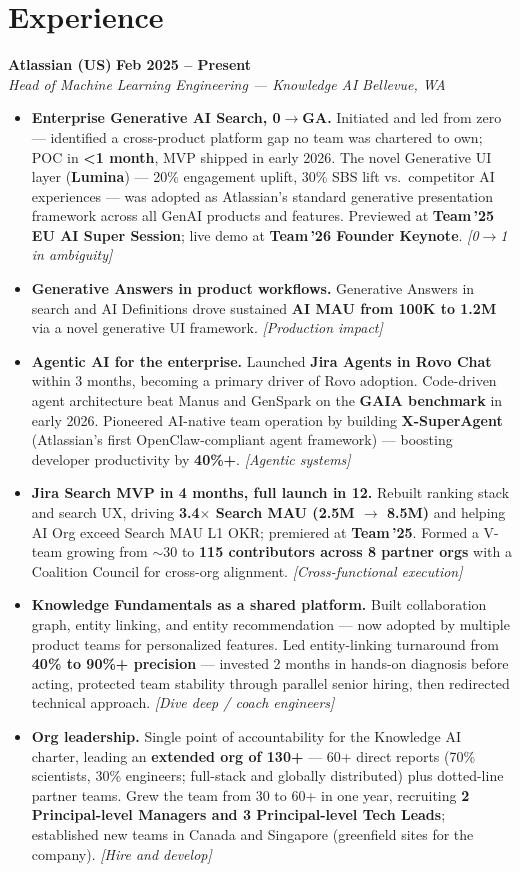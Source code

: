 \documentclass[10.5pt,letterpaper]{article}
\newcommand{\role}[4]{%
  \noindent\textbf{#1} \hfill \textbf{#3}\\
  \textit{#2} \hfill \textit{#4}\par\vspace{2pt}}
\newcommand{\lp}[1]{\textcolor{blue!55!black}{\small\textit{[#1]}}}
\begin{document}
\section*{Experience}

\role{Atlassian (US)}{Head of Machine Learning Engineering --- Knowledge AI}{Feb 2025 -- Present}{Bellevue, WA}
\begin{itemize}
  \item \textbf{Enterprise Generative AI Search, 0$\to$GA.} Initiated and led from zero --- identified a cross-product platform gap no team was chartered to own; POC in \textbf{<1 month}, MVP shipped in early 2026. The novel Generative UI layer (\textbf{Lumina}) --- 20\% engagement uplift, 30\% SBS lift vs.\ competitor AI experiences --- was adopted as Atlassian's standard generative presentation framework across all GenAI products and features. Previewed at \textbf{Team\,'25 EU AI Super Session}; live demo at \textbf{Team\,'26 Founder Keynote}. \lp{0$\to$1 in ambiguity}
  \item \textbf{Generative Answers in product workflows.} Generative Answers in search and AI Definitions drove sustained \textbf{AI MAU from 100K to 1.2M} via a novel generative UI framework. \lp{Production impact}
  \item \textbf{Agentic AI for the enterprise.} Launched \textbf{Jira Agents in Rovo Chat} within 3 months, becoming a primary driver of Rovo adoption. Code-driven agent architecture beat Manus and GenSpark on the \textbf{GAIA benchmark} in early 2026. Pioneered AI-native team operation by building \textbf{X-SuperAgent} (Atlassian's first OpenClaw-compliant agent framework) --- boosting developer productivity by \textbf{40\%+}. \lp{Agentic systems}
  \item \textbf{Jira Search MVP in 4 months, full launch in 12.} Rebuilt ranking stack and search UX, driving \textbf{3.4$\times$ Search MAU (2.5M $\to$ 8.5M)} and helping AI Org exceed Search MAU L1 OKR; premiered at \textbf{Team\,'25}. Formed a V-team growing from $\sim$30 to \textbf{115 contributors across 8 partner orgs} with a Coalition Council for cross-org alignment. \lp{Cross-functional execution}
  \item \textbf{Knowledge Fundamentals as a shared platform.} Built collaboration graph, entity linking, and entity recommendation --- now adopted by multiple product teams for personalized features. Led entity-linking turnaround from \textbf{40\% to 90\%+ precision} --- invested 2 months in hands-on diagnosis before acting, protected team stability through parallel senior hiring, then redirected technical approach. \lp{Dive deep / coach engineers}
  \item \textbf{Org leadership.} Single point of accountability for the Knowledge AI charter, leading an \textbf{extended org of 130+} --- 60+ direct reports (70\% scientists, 30\% engineers; full-stack and globally distributed) plus dotted-line partner teams. Grew the team from 30 to 60+ in one year, recruiting \textbf{2 Principal-level Managers and 3 Principal-level Tech Leads}; established new teams in Canada and Singapore (greenfield sites for the company). \lp{Hire and develop}
\end{itemize}
\end{document}
